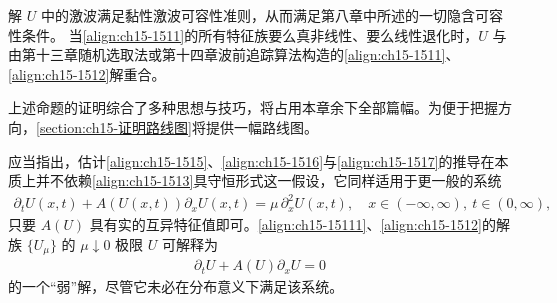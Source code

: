 \documentclass[../../main.tex]{subfiles}
\begin{document}
解 $U$ 中的激波满足黏性激波可容性准则，从而满足第八章中所述的一切隐含可容性条件。
当\eqref{align:ch15-1511}的所有特征族要么真非线性、要么线性退化时，$U$ 与由第十三章随机选取法或第十四章波前追踪算法构造的\eqref{align:ch15-1511}、\eqref{align:ch15-1512}解重合。

上述命题的证明综合了多种思想与技巧，将占用本章余下全部篇幅。为便于把握方向，\cref{section:ch15-证明路线图}将提供一幅路线图。

应当指出，估计\eqref{align:ch15-1515}、\eqref{align:ch15-1516}与\eqref{align:ch15-1517}的推导在本质上并不依赖\eqref{align:ch15-1513}具守恒形式这一假设，它同样适用于更一般的系统
\begin{align}
\partial_t U(x,t)+A(U(x,t))\partial_xU(x,t)=\mu\,\partial_x^2U(x,t),\quad x\in(-\infty,\infty),\ t\in(0,\infty),
\label{align:ch15-15111}
\end{align}
只要 $A(U)$ 具有实的互异特征值即可。\eqref{align:ch15-15111}、\eqref{align:ch15-1512}的解族 $\{U_\mu\}$ 的 $\mu\downarrow0$ 极限 $U$ 可解释为
\begin{align}
\partial_tU+A(U)\partial_xU=0
\label{align:ch15-15112}
\end{align}
的一个“弱”解，尽管它未必在分布意义下满足该系统。
\end{document}
